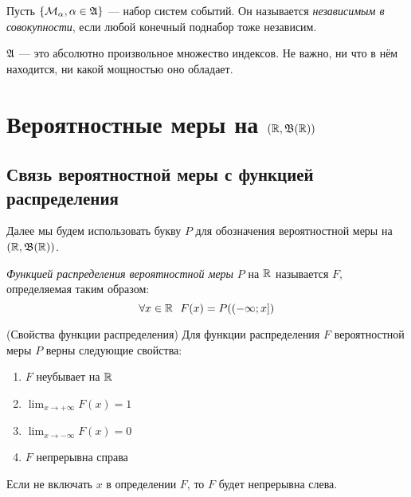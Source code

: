 
\begin{definition}
	Пусть $\{\mathcal{M}_\alpha, \alpha \in \mathfrak{A}\}$ --- набор систем событий. Он называется \textit{независимым в совокупности}, если любой конечный поднабор тоже независим.
\end{definition}

\begin{note}
	$\mathfrak{A}$ --- это абсолютно произвольное множество индексов. Не важно, ни что в нём находится, ни какой мощностью оно обладает.
\end{note}

\section{Вероятностные меры на $(\mathbb{R}, \mathfrak{B}(\mathbb{R}))$}

\subsection{Связь вероятностной меры с функцией распределения}

\begin{note}
	Далее мы будем использовать букву $P$ для обозначения вероятностной меры на $(\mathbb{R}, \mathfrak{B}(\mathbb{R}))$.
\end{note}

\begin{definition}
	\textit{Функцией распределения вероятностной меры} $P$ на $\mathbb{R}$ называется $F$, определяемая таким образом:
	\[
		\forall x \in \mathbb{R}\ \ F(x) = P(\left(-\infty; x\right])
	\]
\end{definition}

\begin{lemma} (Свойства функции распределения)
	Для функции распределения $F$ вероятностной меры $P$ верны следующие свойства:
	\begin{enumerate}
		\item $F$ неубывает на $\mathbb{R}$
		
		\item $\lim_{x \to +\infty} F(x) = 1$
		
		\item $\lim_{x \to -\infty} F(x) = 0$
		
		\item $F$ непрерывна справа
	\end{enumerate}
\end{lemma}

\begin{note}
	Если не включать $x$ в определении $F$, то $F$ будет непрерывна слева.
\end{note}

